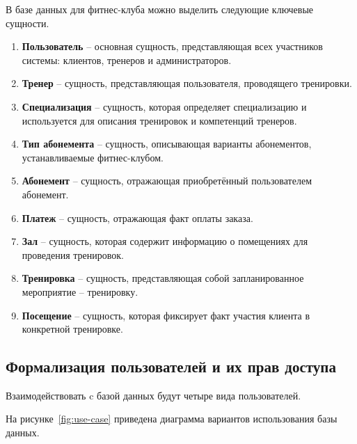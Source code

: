 В базе данных для фитнес-клуба можно выделить следующие ключевые сущности.
\begin{enumerate}[label=\arabic*.]
	\item \textbf{Пользователь} -- основная сущность, представляющая всех участников системы: клиентов, тренеров и администраторов.
	
	\item \textbf{Тренер} -- сущность, представляющая пользователя, проводящего тренировки.
	
	\item \textbf{Специализация} -- сущность, которая определяет специализацию и используется для описания тренировок и компетенций тренеров.
	
	\item \textbf{Тип абонемента} -- сущность, описывающая варианты абонементов, устанавливаемые фитнес-клубом.
	
	\item \textbf{Абонемент} -- сущность, отражающая приобретённый пользователем абонемент.
	
	\item \textbf{Платеж} -- сущность, отражающая факт оплаты заказа.
	
	\item \textbf{Зал} -- сущность, которая содержит информацию о помещениях для проведения тренировок.
	
	\item \textbf{Тренировка} --  сущность, представляющая собой запланированное мероприятие -- тренировку.
	
	\item \textbf{Посещение} -- сущность, которая фиксирует факт участия клиента в конкретной тренировке.
\end{enumerate}

\subsection{Формализация пользователей и их прав доступа}

Взаимодействовать c базой данных будут четыре вида пользователей.

На рисунке~\ref{fig:use-case} приведена диаграмма вариантов использования базы данных.

